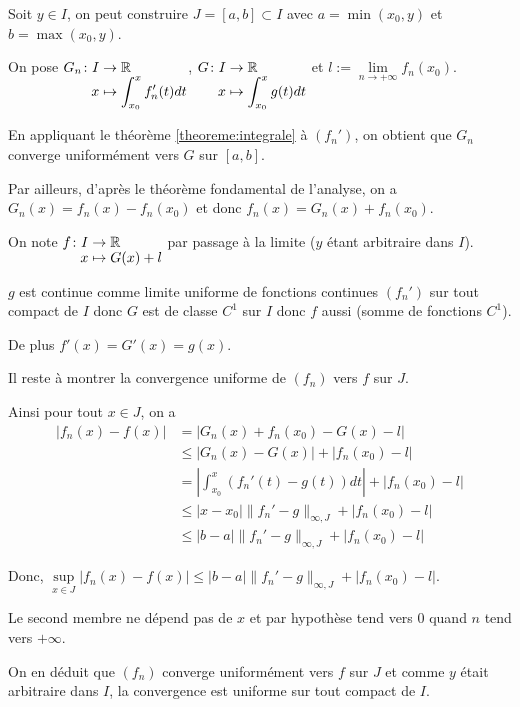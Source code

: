 \documentclass[a4paper,12pt]{article}
\begin{document}
\begin{demonstration}
    Soit $y \in I$, on peut construire $J = [a, b] \subset I$ avec $a = \min(x_0, y)$ et $b = \max(x_0, y)$.

    On pose $\funcdef{G_n}{I}{\R}{x}{\int_{x_0}^x f_n'(t)dt}$, $\funcdef{G}{I}{\R}{x}{\int_{x_0}^x g(t)dt}$ et $l := \lim\limits_{n \to +\infty} f_n(x_0)$.

    En appliquant le théorème \ref{theoreme:integrale} à $(f_n')$, on obtient que $G_n$ converge uniformément vers $G$ sur $[a, b]$.

    Par ailleurs, d'après le théorème fondamental de l'analyse, on a $G_n(x) = f_n(x) - f_n(x_0)$ et donc $f_n(x) = G_n(x) + f_n(x_0)$.
    
    On note $\funcdef{f}{I}{\R}{x}{G(x) + l}$ par passage à la limite ($y$ étant arbitraire dans $I$).

    $g$ est continue comme limite uniforme de fonctions continues $(f_n')$ sur tout compact de $I$ donc $G$ est de classe $C^1$ sur $I$ donc $f$ aussi (somme de fonctions $C^1$).

    De plus $f'(x) = G'(x) = g(x)$.
    
    \vspace{0.5cm}

    Il reste à montrer la convergence uniforme de $(f_n)$ vers $f$ sur $J$.

    Ainsi pour tout $x \in J$, on a
    \begin{align*}
        |f_n(x) - f(x)| &= |G_n(x) + f_n(x_0) - G(x) - l| \\
        &\leq |G_n(x) - G(x)| + |f_n(x_0) - l| \\
        &= |\int_{x_0}^x (f_n'(t) - g(t)) dt| + |f_n(x_0) - l| \\
        &\leq |x - x_0| \|f_n' - g\|_{\infty, J} + |f_n(x_0) - l| \\
        &\leq |b - a| \|f_n' - g\|_{\infty, J} + |f_n(x_0) - l|
    \end{align*}

    Donc, $\sup\limits_{x \in J} |f_n(x) - f(x)| \leq |b - a| \|f_n' - g\|_{\infty, J} + |f_n(x_0) - l|$.

    Le second membre ne dépend pas de $x$ et par hypothèse tend vers $0$ quand $n$ tend vers $+\infty$.

    On en déduit que $(f_n)$ converge uniformément vers $f$ sur $J$ et comme $y$ était arbitraire dans $I$, la convergence est uniforme sur tout compact de $I$.
\end{demonstration}
\end{document}

